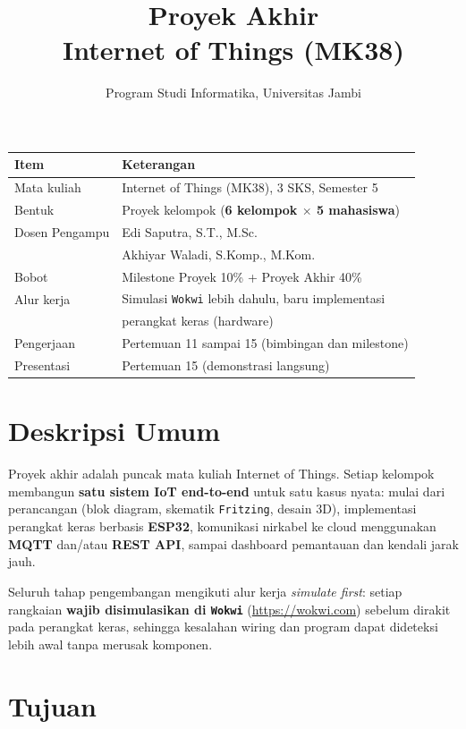 \documentclass[11pt,a4paper]{article}
\title{\textbf{Proyek Akhir}\\Internet of Things (MK38)}
\author{Program Studi Informatika, Universitas Jambi}
\date{}
\begin{document}
\maketitle
\vspace{-2em}

\begin{center}
\begin{tabular}{ll}
\toprule
\textbf{Item} & \textbf{Keterangan} \\
\midrule
Mata kuliah & Internet of Things (MK38), 3 SKS, Semester 5 \\
Bentuk & Proyek kelompok (\textbf{6 kelompok $\times$ 5 mahasiswa}) \\
Dosen Pengampu & Edi Saputra, S.T., M.Sc. \\
 & Akhiyar Waladi, S.Komp., M.Kom. \\
Bobot & Milestone Proyek 10\% + Proyek Akhir 40\% \\
Alur kerja & Simulasi \texttt{Wokwi} lebih dahulu, baru implementasi \\
 & perangkat keras (hardware) \\
Pengerjaan & Pertemuan 11 sampai 15 (bimbingan dan milestone) \\
Presentasi & Pertemuan 15 (demonstrasi langsung) \\
\bottomrule
\end{tabular}
\end{center}

\section{Deskripsi Umum}

Proyek akhir adalah puncak mata kuliah Internet of Things. Setiap kelompok
membangun \textbf{satu sistem IoT end-to-end} untuk satu kasus nyata: mulai
dari perancangan (blok diagram, skematik \texttt{Fritzing}, desain 3D),
implementasi perangkat keras berbasis \textbf{ESP32}, komunikasi nirkabel ke
cloud menggunakan \textbf{MQTT} dan/atau \textbf{REST API}, sampai dashboard
pemantauan dan kendali jarak jauh.

Seluruh tahap pengembangan mengikuti alur kerja \emph{simulate first}: setiap
rangkaian \textbf{wajib disimulasikan di \texttt{Wokwi}}
(\url{https://wokwi.com}) sebelum dirakit pada perangkat keras, sehingga
kesalahan wiring dan program dapat dideteksi lebih awal tanpa merusak
komponen.

\section{Tujuan}
\end{document}

